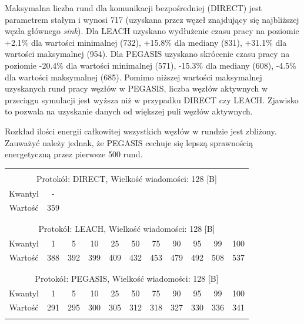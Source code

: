 \documentclass[a4paper,12pt,twoside,openany]{report}
\begin{document}
\par
Maksymalna liczba rund dla komunikacji bezpośredniej (DIRECT) jest parametrem stałym i wynosi 717 (uzyskana przez węzeł znajdujący się najbliższej węzła głównego \textit{sink}).
Dla LEACH uzyskano wydłużenie czasu pracy na poziomie +2.1\% dla wartości minimalnej (732), +15.8\% dla mediany (831), +31.1\% dla wartości maksymalnej (954).
Dla PEGASIS uzyskano skrócenie czasu pracy na poziomie -20.4\% dla wartości minimalnej (571), -15.3\% dla mediany (608), -4.5\% dla wartości maksymalnej (685).
Pomimo niższej wartości maksymalnej uzyskanych rund pracy węzłów w PEGASIS, liczba węzłów aktywnych w przeciągu symulacji jest wyższa niż w przypadku DIRECT czy LEACH.
Zjawisko to pozwala na uzyskanie danych od większej puli węzłów aktywnych.
\par
Rozkład ilości energii całkowitej wszystkich węzłów w rundzie jest zbliżony.
Zauważyć należy jednak, że PEGASIS cechuje się lepszą sprawnością energetyczną przez pierwsze 500 rund. 

\begin{longtable}{*{11}{c}}
\toprule \\*
\multicolumn{11}{c}{Protokół: DIRECT, Wielkość wiadomości: 128 [B]} \\*
Kwantyl	& -	\\*
Wartość	& 359	\\*
\midrule \\*
\\*
\multicolumn{11}{c}{Protokół: LEACH, Wielkość wiadomości: 128 [B]} \\*
Kwantyl	& 1	& 5	& 10	& 25	& 50	& 75	& 90	& 95	& 99	& 100	\\*
Wartość	& 388	& 392	& 399	& 409	& 432	& 453	& 479	& 492	& 508	& 537	\\*
\midrule \\*
\\*
\multicolumn{11}{c}{Protokół: PEGASIS, Wielkość wiadomości: 128 [B]} \\*
Kwantyl	& 1	& 5	& 10	& 25	& 50	& 75	& 90	& 95	& 99	& 100	\\*
Wartość	& 291	& 295	& 300	& 305	& 312	& 318	& 327	& 330	& 336	& 341	\\*
\bottomrule \\*
\end{longtable}
\end{document}
